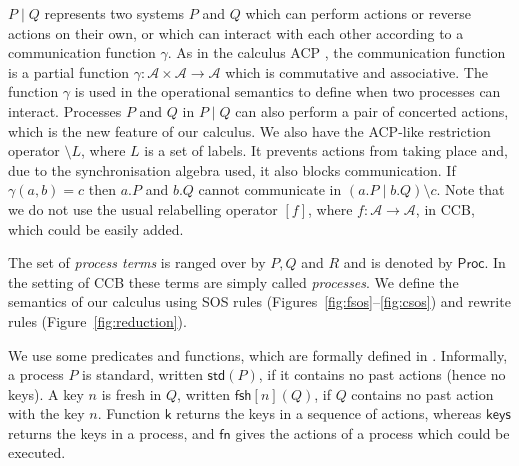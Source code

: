 \documentclass[runningheads]{llncs}
\newcommand{\Proc}{\mathsf{Proc}}
\newcommand{\paral}{\; \vert \;}
\newcommand{\mA}{\mathcal{A}}
\newcommand{\std}[1]{\mathsf{std}(#1)}
\newcommand{\freshpred}[1]{\mathsf{fsh}[#1]}
\begin{document}
$P\paral Q$ represents two systems $P$ and $Q$ which can perform actions or reverse actions on
their own, or which can interact with each other according to a communication function
$\gamma$. As in the calculus ACP \cite{ACPBook}, the communication function is a partial function 
$\gamma: \mathcal A \times \mathcal A \rightarrow \mathcal A$ which is commutative and associative. The function
$\gamma$ is used in the operational semantics to define when two processes can interact. Processes 
$P$ and $Q$ in $P\paral Q$ can also perform a pair of concerted actions,
which is the new feature of our calculus.  We also have the ACP-like restriction operator 
$\setminus L$, where $L$ is a set of labels. It prevents actions from taking place and, due to 
the synchronisation algebra used, it also blocks communication. If $\gamma(a,b)=c$ then $a.P$ and $b.Q$
cannot communicate in $(a.P\paral b.Q)\setminus c$.
Note that we do not use the usual relabelling 
operator $[f]$, where $f: \mA \rightarrow \mA$, in CCB, which could be easily added.

The set of \emph{process terms} is ranged over by $P,Q$ and $R$ and is denoted by $\Proc$. 
In the setting of CCB these terms are simply called \emph{processes}. We define the semantics of our calculus using SOS rules (Figures~\ref{fig:fsos}--\ref{fig:csos}) and rewrite rules (Figure~\ref{fig:reduction}).

We use some predicates and functions, which are formally defined in \cite{KUHN201818}. Informally, a process $P$ is standard, written $\std{P}$, if it contains no past actions (hence no keys). A key $n$ is fresh in $Q$, written $\freshpred{n}(Q)$, if $Q$ contains no past action with the key $n$. Function $\mathsf{k}$ returns the keys in a sequence of actions, whereas $\mathsf{keys}$ returns the keys in a process, and $\mathsf{fn}$ gives the actions of a process which could be executed.
\end{document}
